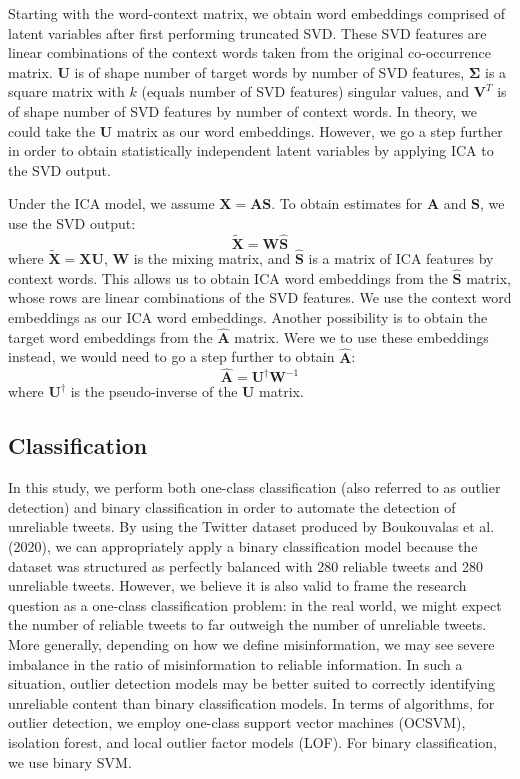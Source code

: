 \documentclass{article}
\begin{document}
Starting with the word-context matrix, we obtain word embeddings
comprised of latent variables after first performing truncated SVD.
These SVD features are linear combinations of the context words taken
from the original co-occurrence matrix. \(\mathbf{U}\) is of shape
number of target words by number of SVD features, \(\mathbf{\Sigma}\) is
a square matrix with \(k\) (equals number of SVD features) singular
values, and \(\mathbf{V}^T\) is of shape number of SVD features by
number of context words. In theory, we could take the \(\mathbf{U}\)
matrix as our word embeddings. However, we go a step further in order to
obtain statistically independent latent variables by applying ICA to the
SVD output.

Under the ICA model, we assume \(\mathbf{X} = \mathbf{A} \mathbf{S}\).
To obtain estimates for \(\mathbf{A}\) and \(\mathbf{S}\), we use the
SVD output: \[\mathbf{\tilde{X}} = \mathbf{W} \mathbf{\hat{S}}\] where
\(\mathbf{\tilde{X}} = \mathbf{X} \mathbf{U}\), \(\mathbf{W}\) is the
mixing matrix, and \(\mathbf{\hat{S}}\) is a matrix of ICA features by
context words. This allows us to obtain ICA word embeddings from the
\(\mathbf{\hat{S}}\) matrix, whose rows are linear combinations of the
SVD features. We use the context word embeddings as our ICA word
embeddings. Another possibility is to obtain the target word embeddings
from the \(\mathbf{\hat{A}}\) matrix. Were we to use these embeddings
instead, we would need to go a step further to obtain
\(\mathbf{\hat{A}}\):
\[\mathbf{\hat{A}} = \mathbf{U}^{\dagger} \mathbf{W}^{-1}\] where
\(\mathbf{U}^{\dagger}\) is the pseudo-inverse of the \(\mathbf{U}\)
matrix.

\hypertarget{classification}{%
\subsection{Classification}\label{classification}}

In this study, we perform both one-class classification (also referred
to as outlier detection) and binary classification in order to automate
the detection of unreliable tweets. By using the Twitter dataset
produced by Boukouvalas et al. (2020), we can appropriately apply a
binary classification model because the dataset was structured as
perfectly balanced with 280 reliable tweets and 280 unreliable tweets.
However, we believe it is also valid to frame the research question as a
one-class classification problem: in the real world, we might expect the
number of reliable tweets to far outweigh the number of unreliable
tweets. More generally, depending on how we define misinformation, we
may see severe imbalance in the ratio of misinformation to reliable
information. In such a situation, outlier detection models may be better
suited to correctly identifying unreliable content than binary
classification models. In terms of algorithms, for outlier detection, we
employ one-class support vector machines (OCSVM), isolation forest, and
local outlier factor models (LOF). For binary classification, we use
binary SVM.
\end{document}
